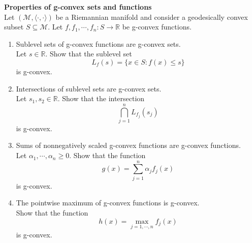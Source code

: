 \documentclass[en, oneside]{assignment}
\begin{document}
\begin{prob} \textbf{Properties of g-convex sets and functions}\\
    Let $(\mathcal M, \langle \cdot, \cdot \rangle)$ be a Riemannian manifold and consider a geodesically convex subset $S \subseteq \mathcal M$.
    Let $f, f_1, \cdots, f_n : S \rightarrow \mathbb{R}$ be g-convex functions.
    \begin{enumerate}[label=(\arabic*)]
        \item Sublevel sets of g-convex functions are g-convex sets.\\
        Let $s \in \mathbb R$. Show that the sublevel set
        \begin{equation*}
            L_f(s) = \{ x \in S : f(x) \leq s \}
        \end{equation*}
        is g-convex. 
        \item Intersections of sublevel sets are g-convex sets.\\
        Let $s_1, s_2 \in \mathbb R$. Show that the intersection 
        \begin{equation*}
            \bigcap _{j=1}^n L_{f_j}(s_j)
        \end{equation*}
        is g-convex.
        \item Sums of nonnegatively scaled g-convex functions are g-convex functions.\\
        Let $\alpha_1, \cdots, \alpha_n \geq 0$. Show that the function
        \begin{equation*}
            g(x) = \sum_{j=1}^n \alpha_j f_j(x)
        \end{equation*}
        is g-convex.
        \item The pointwise maximum of g-convex functions is g-convex.\\
        Show that the function
        \begin{equation*}
            h(x) = \max_{j=1, \cdots, n} f_j(x)
        \end{equation*} 
        is g-convex.
    \end{enumerate}
\end{prob}
\end{document}
